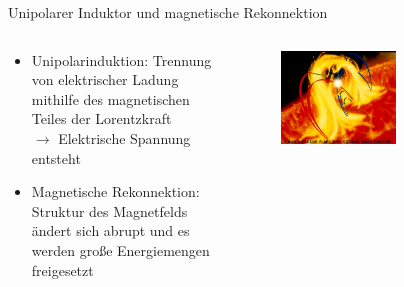   \begin{frame}{Unipolarer Induktor und magnetische Rekonnektion}
    \begin{columns}
   \begin{column}{0.5\textwidth}
    \begin{itemize}
      \setlength\itemsep{2em}
      \item  Unipolarinduktion: Trennung von elektrischer Ladung mithilfe des magnetischen Teiles der Lorentzkraft\\[1.5em]
            $\longrightarrow$ Elektrische Spannung entsteht
      \item  Magnetische Rekonnektion: Struktur des Magnetfelds ändert sich abrupt und es werden große Energiemengen freigesetzt
    \end{itemize}
  \vspace{2em}
  \end{column}
  \begin{column}{0.5\textwidth}
  \begin{figure}
    \centering
    \includegraphics[width=0.6\textwidth]{images/rekonnektion.png}
  \end{figure}
  \end{column}
    \end{columns}
  \end{frame}


